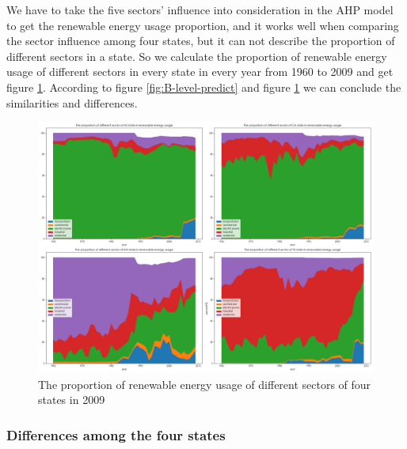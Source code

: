 \documentclass[a4paper,11pt]{article}
\begin{document}
\par We have to take the five sectors' influence into consideration in the AHP model to get the renewable energy usage proportion, and it works well when comparing the sector influence among four states, but it can not describe the proportion of different sectors in a state. So we calculate the proportion of renewable energy usage of different sectors in every state in every year from 1960 to 2009 and get figure \ref{fig:B-percent}. According to figure \ref{fig:B-level-predict} and figure \ref{fig:B-percent} we can conclude the similarities and differences.

\begin{figure}[H]%
    \centering 
    \includegraphics[width=1\textwidth]{./Pic/B-percent.png}
    \caption{The proportion of renewable energy usage of different sectors of four states in 2009}
    \label{fig:B-percent}  
\end{figure}


\subsubsection{Differences among the four states}
\end{document}
